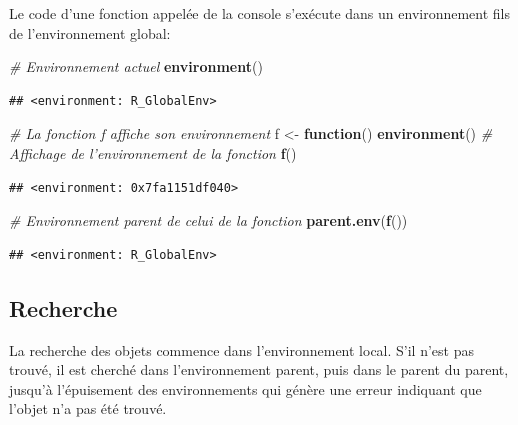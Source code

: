 \documentclass[
  12pt,
  french,
  a4paper,
  extrafontsizes,onecolumn,openright
  ]{memoir}
\newenvironment{Shaded}{\begin{snugshade}}{\end{snugshade}}
\newcommand{\CommentTok}[1]{\textcolor[rgb]{0.56,0.35,0.01}{\textit{#1}}}
\newcommand{\ControlFlowTok}[1]{\textcolor[rgb]{0.13,0.29,0.53}{\textbf{#1}}}
\newcommand{\KeywordTok}[1]{\textcolor[rgb]{0.13,0.29,0.53}{\textbf{#1}}}
\newcommand{\NormalTok}[1]{#1}
\newcommand{\StringTok}[1]{\textcolor[rgb]{0.31,0.60,0.02}{#1}}
\begin{document}
\normalsize

Le code d'une fonction appelée de la console s'exécute dans un environnement fils de l'environnement global:

\scriptsize

\begin{Shaded}
\begin{Highlighting}[]
\CommentTok{# Environnement actuel}
\KeywordTok{environment}\NormalTok{()}
\end{Highlighting}
\end{Shaded}

\begin{verbatim}
## <environment: R_GlobalEnv>
\end{verbatim}

\begin{Shaded}
\begin{Highlighting}[]
\CommentTok{# La fonction f affiche son environnement}
\NormalTok{f <-}\StringTok{ }\ControlFlowTok{function}\NormalTok{() }\KeywordTok{environment}\NormalTok{()}
\CommentTok{# Affichage de l'environnement de la fonction}
\KeywordTok{f}\NormalTok{()}
\end{Highlighting}
\end{Shaded}

\begin{verbatim}
## <environment: 0x7fa1151df040>
\end{verbatim}

\begin{Shaded}
\begin{Highlighting}[]
\CommentTok{# Environnement parent de celui de la fonction}
\KeywordTok{parent.env}\NormalTok{(}\KeywordTok{f}\NormalTok{())}
\end{Highlighting}
\end{Shaded}

\begin{verbatim}
## <environment: R_GlobalEnv>
\end{verbatim}

\normalsize

\hypertarget{recherche}{%
\subsection{Recherche}\label{recherche}}

La recherche des objets commence dans l'environnement local.
S'il n'est pas trouvé, il est cherché dans l'environnement parent, puis dans le parent du parent, jusqu'à l'épuisement des environnements qui génère une erreur indiquant que l'objet n'a pas été trouvé.
\end{document}
